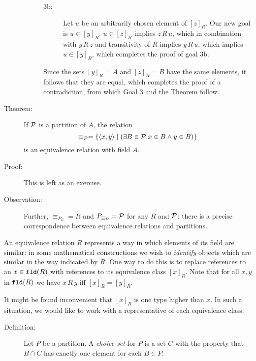 \documentclass[12pt]{book}
\begin{document}
\begin{description}
\begin{description}
\begin{description}
\item[3b:] Let $u$ be an arbitrarily chosen element of $[z]_R$.  Our
new goal is $u \in [y]_R$.  $u \in [z]_R$ implies $z\,R\,u$, which in
combination with $y\,R\,z$ and transitivity of $R$ implies $y\,R\,u$,
which implies $u \in [y]_R$, which completes the proof of goal 3b.
\end{description}
Since the sets $[y]_R=A$ and $[z]_R = B$ have the same elements, it
follows that they are equal, which completes the proof of a
contradiction, from which Goal 3 and the Theorem follow.



\end{description}

\item[Theorem:] If $\cal P$ is a partition of $A$, the relation
$$\equiv_{\cal P} = \{\left<x,y\right>\mid (\exists B \in {\cal P}.x\in
B \wedge y \in B)\}$$ is an equivalence relation with field $A$.

\item[Proof:]  This is left as an exercise.

\item[Observation:] Further, $\equiv_{P_R} = R$ and $P_{\equiv_{\cal
P}}={\cal P}$ for any $R$ and $\cal P$: there is a precise
correspondence between equivalence relations and partitions.

\end{description}

An equivalence relation $R$ represents a way in which elements of its
field are similar: in some mathematical constructions we wish to {\em
identify\/} objects which are similar in the way indicated by $R$.
One way to do this is to replace references to an $x \in {\tt fld}(R)$
with references to its equivalence class $[x]_R$.  Note that for all $x,y$ in
${\tt fld}(R)$ we have $x\,R\,y$ iff $[x]_R=[y]_R$.

It might be found inconvenient that $[x]_R$ is one type higher than
$x$.  In such a situation, we would like to work with a representative
of each equivalence class.  

\begin{description}

\item[Definition:] Let $P$ be a partition.  A {\em choice set\/} for
$P$ is a set $C$ with the property that $B \cap C$ has exactly one
element for each $B \in P$.

\end{description}
\end{document}
